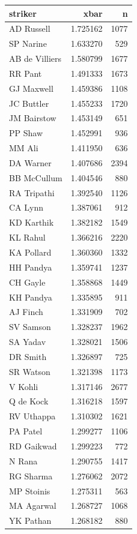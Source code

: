 \documentclass[
  12pt,
]{article}
\begin{document}
\begin{longtable}[]{@{}lrr@{}}
\toprule\noalign{}
striker & xbar & n \\
\midrule\noalign{}
\endhead
\bottomrule\noalign{}
\endlastfoot
AD Russell & 1.725162 & 1077 \\
SP Narine & 1.633270 & 529 \\
AB de Villiers & 1.580799 & 1677 \\
RR Pant & 1.491333 & 1673 \\
GJ Maxwell & 1.459386 & 1108 \\
JC Buttler & 1.455233 & 1720 \\
JM Bairstow & 1.453149 & 651 \\
PP Shaw & 1.452991 & 936 \\
MM Ali & 1.411950 & 636 \\
DA Warner & 1.407686 & 2394 \\
BB McCullum & 1.404546 & 880 \\
RA Tripathi & 1.392540 & 1126 \\
CA Lynn & 1.387061 & 912 \\
KD Karthik & 1.382182 & 1549 \\
KL Rahul & 1.366216 & 2220 \\
KA Pollard & 1.360360 & 1332 \\
HH Pandya & 1.359741 & 1237 \\
CH Gayle & 1.358868 & 1449 \\
KH Pandya & 1.335895 & 911 \\
AJ Finch & 1.331909 & 702 \\
SV Samson & 1.328237 & 1962 \\
SA Yadav & 1.328021 & 1506 \\
DR Smith & 1.326897 & 725 \\
SR Watson & 1.321398 & 1173 \\
V Kohli & 1.317146 & 2677 \\
Q de Kock & 1.316218 & 1597 \\
RV Uthappa & 1.310302 & 1621 \\
PA Patel & 1.299277 & 1106 \\
RD Gaikwad & 1.299223 & 772 \\
N Rana & 1.290755 & 1417 \\
RG Sharma & 1.276062 & 2072 \\
MP Stoinis & 1.275311 & 563 \\
MA Agarwal & 1.268727 & 1068 \\
YK Pathan & 1.268182 & 880 \\

\end{longtable}
\end{document}
